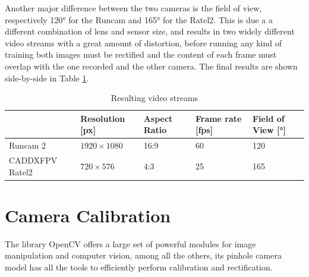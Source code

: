 Another major difference between the two cameras is the field of view, respectively 120° for the Runcam and 165° for the Ratel2. This is due a a different combination of lens and sensor size, and results in two widely different video streams with a great amount of distortion, before running any kind of training both images must be rectified and the content of each frame must overlap with the one recorded and the other camera. The final results are shown side-by-side in Table \ref{tab:cam_table}.






\begin{table}[h]
\centering
\caption{Resulting video streams}
\label{tab:cam_table}
\begin{tabular}{l|l|l|l|l|}
  \cline{2-5}
                                        & \cellcolor[HTML]{C0C0C0}Resolution {[}px{]} & \cellcolor[HTML]{C0C0C0}Aspect Ratio & \cellcolor[HTML]{C0C0C0}Frame rate {[}fps{]} & \cellcolor[HTML]{C0C0C0}Field of View {[}°{]} \\ \hline
  \multicolumn{1}{|l|}{Runcam 2}        &  \(1920\times1080\)                                   & 16:9                                 & 60                                           & 120                                           \\ \hline
  \multicolumn{1}{|l|}{CADDXFPV Ratel2} &  \(720\times576\)                                     & 4:3                                  & 25                                           & 165                                           \\ \hline
  \end{tabular}
\end{table}





\section {Camera Calibration}
\label{sec:camera_calib}

The library OpenCV\cite{opencv} offers a large set of powerful modules for image manipulation and computer vision, among all the others, its pinhole camera model has all the tools to efficiently perform calibration and rectification.

